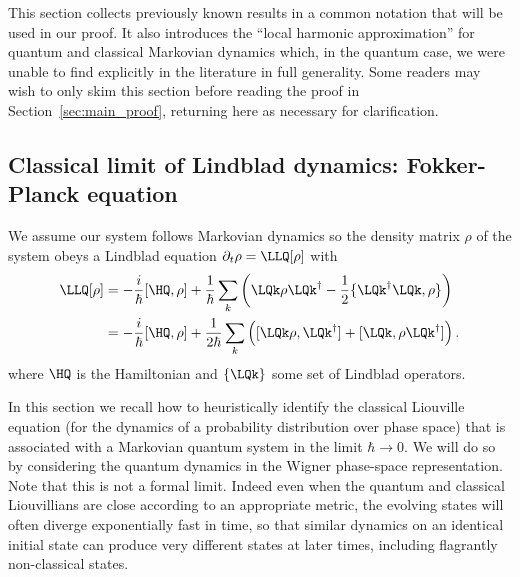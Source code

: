 \documentclass{article}
\numberwithin{equation}{section}
\begin{document}
This section collects previously known results in a common notation that will be used in our proof.  It also introduces the ``local harmonic approximation'' for quantum and classical Markovian dynamics which, in the quantum case, we were unable to find explicitly in the literature in full generality.  Some readers may wish to only skim this section before reading the proof in Section~\ref{sec:main_proof}, returning here as necessary for clarification.

\subsection{Classical limit of Lindblad dynamics: Fokker-Planck equation}\label{sec:corresponding-dynamics}

We assume our system follows Markovian dynamics so the density matrix $\rho$ of the system obeys a Lindblad equation $\partial_t \rho = \LLQ[\rho]$ with
\begin{align}
	\label{eq:lindblad}
	\LLQ[\rho] & = -\frac{i}{\hbar}[\HQ,\rho] + \frac{1}{\hbar} \sum_k \left( \LQk \rho \LQk^\dagger - \frac{1}{2} \{ \LQk^\dagger \LQk,\rho\} \right) \\
	\label{eq:lindblad-with-commutators}
	& =  -\frac{i}{\hbar}[\HQ,\rho] + \frac{1}{2\hbar} \sum_k \left( [ \LQk \rho, \LQk^\dagger] + [\LQk, \rho \LQk^\dagger] \right).
\end{align}
where $\HQ$ is the Hamiltonian and $\{\LQk\}$ some set of Lindblad operators.

In this section we recall how to heuristically identify the classical Liouville equation (for the dynamics of a probability distribution over phase space) that is associated with a Markovian quantum system in the limit $\hbar \to 0$.  We will do so by considering the quantum dynamics in the Wigner phase-space representation. Note that this is not a formal limit.  Indeed even when the quantum and classical Liouvillians are close according to an appropriate metric, the evolving states will often diverge exponentially fast in time, so that similar dynamics on an identical initial state can produce very different states at later times, including flagrantly non-classical states.
\end{document}
